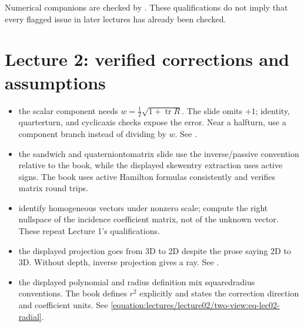 \documentclass[letterpaper,11pt,english,openany,oneside]{jupyterBook}
\begin{document}
\sphinxAtStartPar
Numerical companions are checked by . These qualifications do not imply that every flagged issue in later lectures has already been checked.


\section{Lecture 2: verified corrections and assumptions}
\label{\detokenize{reference/errata:lecture-2-verified-corrections-and-assumptions}}\begin{itemize}
\item {}
\sphinxAtStartPar
{} the scalar component needs \(w=\frac12\sqrt{1+\operatorname{tr}R}\). The slide omits \(+1\); identity, quarter\sphinxhyphen{}turn, and cyclic\sphinxhyphen{}axis checks expose the error. Near a half\sphinxhyphen{}turn, use a component branch instead of dividing by \(w\). See {\hyperref[\detokenize{lectures/lecture02/quaternions:lec02-quaternions}]{}}.

\item {}
\sphinxAtStartPar
{} the sandwich and quaternion\sphinxhyphen{}to\sphinxhyphen{}matrix slide use the inverse/passive convention relative to the book, while the displayed skew\sphinxhyphen{}entry extraction uses active signs. The book uses active Hamilton formulas consistently and verifies matrix round trips.

\item {}
\sphinxAtStartPar
{} identify homogeneous vectors under nonzero scale; compute the right nullspace of the incidence coefficient matrix, not of the unknown vector. These repeat Lecture 1’s qualifications.

\item {}
\sphinxAtStartPar
{} the displayed projection goes from 3D to 2D despite the prose saying 2D to 3D. Without depth, inverse projection gives a ray. See {\hyperref[\detokenize{lectures/lecture01/quiz-practice:lec01-quiz-practice}]{}}.

\item {}
\sphinxAtStartPar
{} the displayed polynomial and radius definition mix squared\sphinxhyphen{}radius conventions. The book defines \(r^2\) explicitly and states the correction direction and coefficient units. See \eqref{equation:lectures/lecture02/two-view:eq-lec02-radial}.


\end{itemize}
\end{document}
